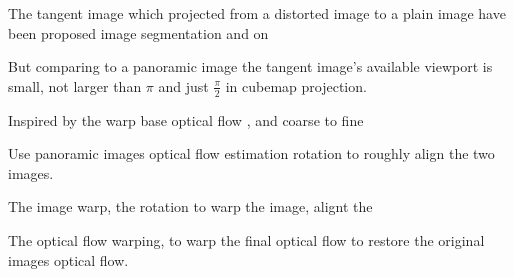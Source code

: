 The tangent image which projected from a distorted image to a plain image have been proposed image segmentation and on \cite{eldercvpr2020} 

But comparing to a panoramic image the tangent image's available viewport is small, not larger than $\pi$ and just $\frac{\pi}{2}$ in cubemap projection.

Inspired by the warp base optical flow \cite{?}, and coarse to fine 

Use panoramic images optical flow estimation rotation to roughly align the two images.


The image warp, the rotation to warp the image, alignt the 

The optical flow warping, to warp the final optical flow to restore the original images optical flow.